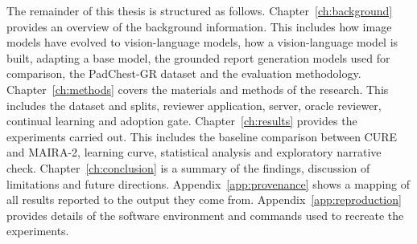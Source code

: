 The remainder of this thesis is structured as follows. Chapter~\ref{ch:background}
provides an overview of the background information. This includes how image models
have evolved to vision-language models, how a vision-language model is built, adapting
a base model, the grounded report generation models used for comparison, the
PadChest-GR dataset and the evaluation methodology. Chapter~\ref{ch:methods} covers
the materials and methods of the research. This includes the dataset and splits,
reviewer application, server, oracle reviewer, continual learning and adoption gate.
Chapter~\ref{ch:results} provides the experiments carried out. This includes the
baseline comparison between CURE and MAIRA-2, learning curve, statistical analysis and
exploratory narrative check. Chapter~\ref{ch:conclusion} is a summary of the findings,
discussion of limitations and future directions. Appendix~\ref{app:provenance} shows a
mapping of all results reported to the output they come from.
Appendix~\ref{app:reproduction} provides details of the software environment and
commands used to recreate the experiments.
